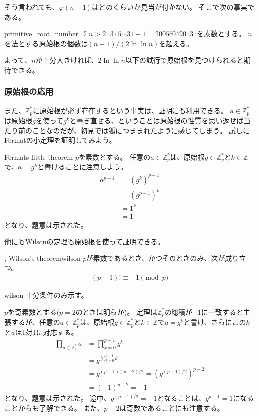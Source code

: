 そう言われても、$\varphi(n-1)$はどのくらいか見当が付かない。
そこで次の事実である。

\begin{Prop}{\cite{A_Computational_Perspective}}{primitive_root_number_2}
$n>2\cdot3\cdot5\cdots31+1=200560490131$を素数とする。
$n$を法とする原始根の個数は$(n-1)/(2\ln\ln{n})$を超える。
\end{Prop}

よって、$n$が十分大きければ、$2\ln\ln{n}$以下の試行で原始根を見つけられると期待できる。

\subsubsection{原始根の応用}
また、$\mathbb{Z}_p^*$に原始根が必ず存在するという事実は、証明にも利用できる。
$a\in\mathbb{Z}_p^*$は原始根$g$を使って$g^k$と書き直せる、ということは原始根の性質を思い返せば当たり前のことなのだが、初見では狐につままれたように感じてしまう。
試しにFermatの小定理を証明してみよう。

\begin{thProof}{Fermats-little-theorem}
$p$を素数とする。
任意の$a\in\mathbb{Z}_p^*$は、原始根$g\in\mathbb{Z}_p^*$と$k\in\mathbb{Z}$で、$a=g^k$と書けることに注意しよう。
\begin{align*}
a^{p-1} &= (g^k)^{p-1}\\
 &= (g^{p-1})^k\\
 &= 1^k \\
 &= 1
\end{align*}
となり、題意は示された。
\end{thProof}

他にもWilsonの定理も原始根を使って証明できる。

\begin{Theo}{, Wilson's theorem}{wilson}
$p$が素数であるとき、かつそのときのみ、次が成り立つ。
\begin{align*}
(p-1)! \equiv -1 \pmod{p}
\end{align*}
\end{Theo}

\begin{thProof}{wilson}
十分条件のみ示す。

$p$を奇素数とする($p=2$のときは明らか)。
定理は$\mathbb{Z}_p^*$の総積が$-1$に一致すると主張するが、任意の$a\in\mathbb{Z}_p^*$は、原始根$g\in\mathbb{Z}_p^*$と$k\in\mathbb{Z}$で$a=g^k$と書け、さらにこの$k$と$a$は1対1に対応する。
\begin{align*}
\prod_{a \in \mathbb{Z}_p^*} a &= \prod_{k=0}^{p-1} g^k\\
 &= g^{\sum_{k=0}^{p-1}k}\\
 &= g^{(p-1)(p-2)/2} = (g^{(p-1)/2})^{p-2}\\
 &= (-1)^{p-2} = -1
\end{align*}
となり、題意は示された。
途中、$g^{(p-1)/2}=-1$となることは、$g^{p-1}=1$になることからも了解できる。
また、$p-2$は奇数であることにも注意する。
\end{thProof}

